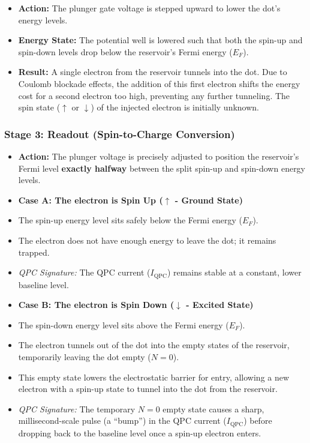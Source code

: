 \documentclass[
]{article}
\providecommand{\tightlist}{%
  \setlength{\itemsep}{0pt}\setlength{\parskip}{0pt}}
\begin{document}
\begin{itemize}
\tightlist
\item
  \textbf{Action:} The plunger gate voltage is stepped upward to lower
  the dot's energy levels.
\item
  \textbf{Energy State:} The potential well is lowered such that both
  the spin-up and spin-down levels drop below the reservoir's Fermi
  energy (\(E_F\)).
\item
  \textbf{Result:} A single electron from the reservoir tunnels into the
  dot. Due to Coulomb blockade effects, the addition of this first
  electron shifts the energy cost for a second electron too high,
  preventing any further tunneling. The spin state (\(\uparrow\) or
  \(\downarrow\)) of the injected electron is initially unknown.
\end{itemize}

\subsubsection{Stage 3: Readout (Spin-to-Charge
Conversion)}\label{stage-3-readout-spin-to-charge-conversion}

\begin{itemize}
\item
  \textbf{Action:} The plunger voltage is precisely adjusted to position
  the reservoir's Fermi level \textbf{exactly halfway} between the split
  spin-up and spin-down energy levels.
\item
  \textbf{Case A: The electron is Spin Up (\(\uparrow\) - Ground State)}
\item
  The spin-up energy level sits safely below the Fermi energy (\(E_F\)).
\item
  The electron does not have enough energy to leave the dot; it remains
  trapped.
\item
  \emph{QPC Signature:} The QPC current (\(I_{\text{QPC}}\)) remains
  stable at a constant, lower baseline level.
\item
  \textbf{Case B: The electron is Spin Down (\(\downarrow\) - Excited
  State)}
\item
  The spin-down energy level sits above the Fermi energy (\(E_F\)).
\item
  The electron tunnels out of the dot into the empty states of the
  reservoir, temporarily leaving the dot empty (\(N=0\)).
\item
  This empty state lowers the electrostatic barrier for entry, allowing
  a new electron with a spin-up state to tunnel into the dot from the
  reservoir.
\item
  \emph{QPC Signature:} The temporary \(N=0\) empty state causes a
  sharp, millisecond-scale pulse (a ``bump'') in the QPC current
  (\(I_{\text{QPC}}\)) before dropping back to the baseline level once a
  spin-up electron enters.
\end{itemize}
\end{document}
